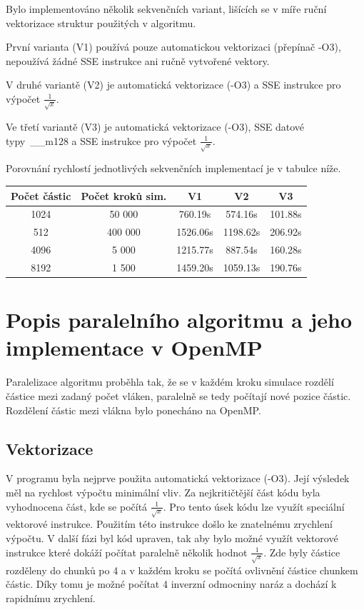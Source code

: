\documentclass[12pt]{article}
\begin{document}
Bylo implementováno několik sekvenčních variant, lišících se v míře ruční vektorizace struktur použitých v algoritmu.

První varianta (V1) používá pouze automatickou vektorizaci (přepínač -O3), nepoužívá žádné SSE instrukce ani ručně vytvořené vektory.

V druhé variantě (V2) je automatická vektorizace (-O3) a SSE instrukce pro výpočet ${\frac{1}{\sqrt{x}}}$.

Ve třetí variantě (V3) je automatická vektorizace (-O3), SSE datové typy~\_\_m128 a SSE in\-struk\-ce pro výpočet ${\frac{1}{\sqrt{x}}}$.

Porovnání rychlostí jednotlivých sekvenčních implementací je v tabulce níže.

\begin{center}
\begin{tabular}{c | c | c | c | c}
\textbf{Počet částic} & \textbf{Počet kroků sim.}  & \textbf{V1} & \textbf{V2} & \textbf{V3} \\ \hline \hline
1024 & 50 000 & 760.19s & 574.16s & 101.88s \\ \hline
512 & 400 000 & 1526.06s & 1198.62s & 206.92s \\ \hline
4096 & 5 000 & 1215.77s & 887.54s & 160.28s \\ \hline
8192 & 1 500 & 1459.20s & 1059.13s & 190.76s \\ \hline
\end{tabular}
\end{center}

\section{Popis paralelního algoritmu a jeho implementace v OpenMP}
Paralelizace algoritmu proběhla tak, že se v každém kroku simulace rozdělí částice mezi zadaný počet vláken, paralelně se tedy počítají nové pozice částic.
Rozdělení částic mezi vlákna bylo ponecháno na OpenMP.

\subsection{Vektorizace}

V prog\-ramu byla nej\-prve pou\-žita au\-toma\-tická vekto\-ri\-za\-ce (-O3).
Její výsledek měl na rychlost výpočtu minimální vliv. Za nejkritičtější část kódu byla vyhodnocena část, kde se počítá ${\frac{1}{\sqrt{x}}}$.
Pro tento úsek kódu lze využít speciální vektorové instrukce. Použitím této instrukce došlo ke znatelnému zrychlení výpočtu.
V další fázi byl kód upraven, tak aby bylo možné využít vektorové instrukce které dokáží počítat paralelně několik hodnot ${\frac{1}{\sqrt{x}}}$.
Zde byly částice rozděleny do chunků po 4 a v každém kroku se počítá ovlivnění částice chunkem částic.
Díky tomu je možné počítat 4 inverzní odmocniny naráz a dochází k rapidnímu zrychlení. 
\end{document}

